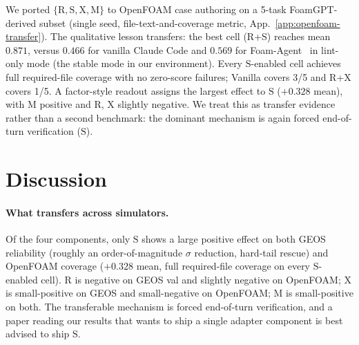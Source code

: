 \documentclass{article}
\begin{document}
We ported $\{\mathrm{R,S,X,M}\}$ to OpenFOAM case authoring on a 5-task FoamGPT-derived subset (single seed, file-text-and-coverage metric, App.~\ref{app:openfoam-transfer}). The qualitative lesson transfers: the best cell (R+S) reaches mean $0.871$, versus $0.466$ for vanilla Claude Code and $0.569$ for Foam-Agent~\citep{foamagent2025} in lint-only mode (the stable mode in our environment). Every $\mathrm{S}$-enabled cell achieves full required-file coverage with no zero-score failures; Vanilla covers 3/5 and R+X covers 1/5. A factor-style readout assigns the largest effect to $\mathrm{S}$ ($+0.328$ mean), with $\mathrm{M}$ positive and $\mathrm{R}$, $\mathrm{X}$ slightly negative. We treat this as transfer evidence rather than a second benchmark: the dominant mechanism is again forced end-of-turn verification ($\mathrm{S}$).


\section{Discussion}
\label{sec:discussion}
\label{sec:analysis}
\label{subsec:limitations}

\paragraph{What transfers across simulators.} Of the four components, only $\mathrm{S}$ shows a large positive effect on both GEOS reliability (roughly an order-of-magnitude $\sigma$ reduction, hard-tail rescue) and OpenFOAM coverage ($+0.328$ mean, full required-file coverage on every $\mathrm{S}$-enabled cell). $\mathrm{R}$ is negative on GEOS val and slightly negative on OpenFOAM; $\mathrm{X}$ is small-positive on GEOS and small-negative on OpenFOAM; $\mathrm{M}$ is small-positive on both. The transferable mechanism is forced end-of-turn verification, and a paper reading our results that wants to ship a single adapter component is best advised to ship $\mathrm{S}$.
\end{document}
